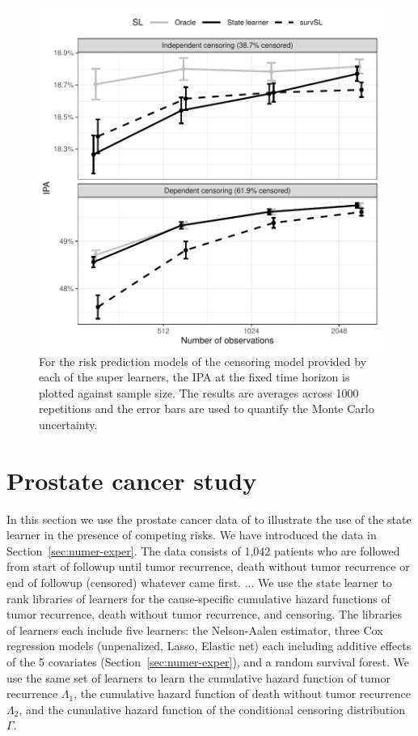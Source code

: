 \documentclass[a4paper,danish]{article}
\theoremstyle{plain} %
\numberwithin{theorem}{section}
\theoremstyle{definition} %
\theoremstyle{remark}
\newcommand{\1}{\mathds{1}}
\begin{document}
\begin{figure}
  \centering %
  \includegraphics[width=.7\linewidth]{experiment-fig-sl-survSL-cens.pdf}
  \caption[]{For the risk prediction models of the censoring model provided by
    each of the super learners, the IPA at the fixed time horizon is plotted
    against sample size. The results are averages across 1000 repetitions and
    the error bars are used to quantify the Monte Carlo uncertainty.}
  \label{fig:zelefski-cens}
\end{figure}


\section{Prostate cancer study}
\label{sec:real-data-appl}

In this section we use the prostate cancer data of
\cite{kattan2000pretreatment} to illustrate the use of the state
learner in the presence of competing risks. We have introduced the
data in Section~\ref{sec:numer-exper}. The data consists of 1,042
patients who are followed from start of followup until tumor
recurrence, death without tumor recurrence or end of followup
(censored) whatever came first. ... We use the state
learner to rank libraries of learners for the cause-specific
cumulative hazard functions of tumor recurrence, death without tumor
recurrence, and censoring.  The libraries of learners each include
five learners: the Nelson-Aalen estimator, three Cox regression models
(unpenalized, Lasso, Elastic net) each including additive effects of
the 5 covariates (Section~\ref{sec:numer-exper}), and a random
survival forest. We use the same set of learners to learn the
cumulative hazard function of tumor recurrence \( \Lambda_1 \), the
cumulative hazard function of death without tumor recurrence
\( \Lambda_2 \), and the cumulative hazard function of the conditional
censoring distribution $\Gamma$.  
\end{document}
